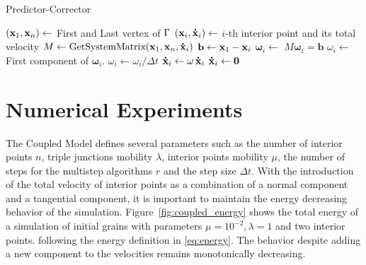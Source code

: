 \begin{algorithm}[t]
\caption{Predictor-Corrector}
\label{alg:predcorr}
\begin{algorithmic}[1]
\State $(\x_1,\x_n) \gets$ First and Last vertex of $\Gamma$
\State $(\x_i, \dotx_i) \gets $ $i$-th interior point and its total velocity
\State $M \gets \text{GetSystemMatrix}(\x_1, \x_n, \dotx_i)$ 
    \State $\mathbf{b} \gets \x_1 - \x_i$
    \State $\bm{\omega}_i \gets$  $M \bm{\omega}_i = \mathbf{b}$
    \State $\omega_i \gets $ First component of $\bm{\omega}_i$.
    \State $\omega_i \gets \omega_i / \Delta t$
            \State $\dotx_i \gets \omega \,\dotx_i$
        \Else
            \State $\dotx_i \gets \mathbf{0}$
        \EndIf
    \EndIf
\EndIf
\EndFor
\EndProcedure
\end{algorithmic}
\end{algorithm}


\section{Numerical Experiments}

The Coupled Model defines several parameters such as the number of interior points $n$, triple junctions mobility $\lambda$, interior points mobility $\mu$, the number of steps for the multistep algorithms $r$ and the step size $\Delta t$. With the introduction of the total velocity of interior points as a combination of a normal component and a tangential component, it is important to maintain the energy decreasing behavior of the simulation. Figure~\ref{fig:coupled_energy} shows the total energy of a simulation of initial  grains with parameters $\mu=10^{-2}, \lambda=1$ and two interior points. following the energy definition in \eqref{eq:energy}. The behavior despite adding a new component to the velocities remains monotonically decreasing.

